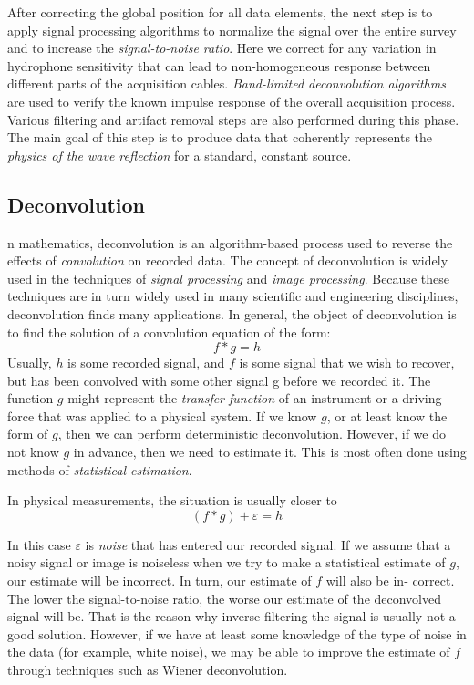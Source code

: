 \documentclass[twocolumn]{article}
\begin{document}
After correcting the global position for all data elements, the next step is to apply signal processing algorithms to normalize the signal over the entire survey and to increase the \emph{signal-to-noise ratio}. Here we correct for any variation in hydrophone sensitivity that can lead to non-homogeneous response between different parts of the acquisition cables. \emph{Band-limited deconvolution algorithms} are used to verify the known impulse response of the overall acquisition process. Various filtering and artifact removal steps are also performed during this phase. The main goal of this step is to produce data that coherently represents the \emph{physics of the wave reflection} for a standard, constant source.

\subsection{Deconvolution}
n mathematics, deconvolution is an algorithm-based process used to reverse the effects of \textit{convolution} on recorded data.
The concept of deconvolution is widely used in the techniques of \textit{signal processing} and \textit{image processing}. 
Because these techniques are in turn widely used in many scientific and engineering disciplines, deconvolution finds many applications.
In general, the object of deconvolution is to find the solution of a convolution equation of the form:
$$ f * g = h$$
Usually, $h$ is some recorded signal, and $f$ is some signal that we wish to recover, but has been convolved with some other signal g before we recorded it. 
The function $g$ might represent the \textit{transfer function} of an instrument or a driving force that was applied to a physical system. If we know $g$, or at least know the form of $g$, then we can perform deterministic deconvolution. However, if we do not know $g$ in advance, then we need to estimate it. This is most often done using methods of \textit{statistical estimation}.

In physical measurements, the situation is usually closer to
$$(f * g) + \varepsilon = h $$

In this case $\varepsilon$ is \textit{noise} that has entered our recorded signal. If we assume that a noisy signal or image is noiseless when we try to make a statistical estimate of $g$, our estimate will be incorrect. 
In turn, our estimate of $f$ will also be in‐ correct. 
The lower the signal-to-noise ratio, the worse our estimate of the deconvolved signal will be. 
That is the reason why inverse filtering the signal is usually not a good solution. 
However, if we have at least some knowledge of the type of noise in the data (for example, white noise), we may be able to improve the estimate of $f$ through techniques such as Wiener deconvolution.
\end{document}
